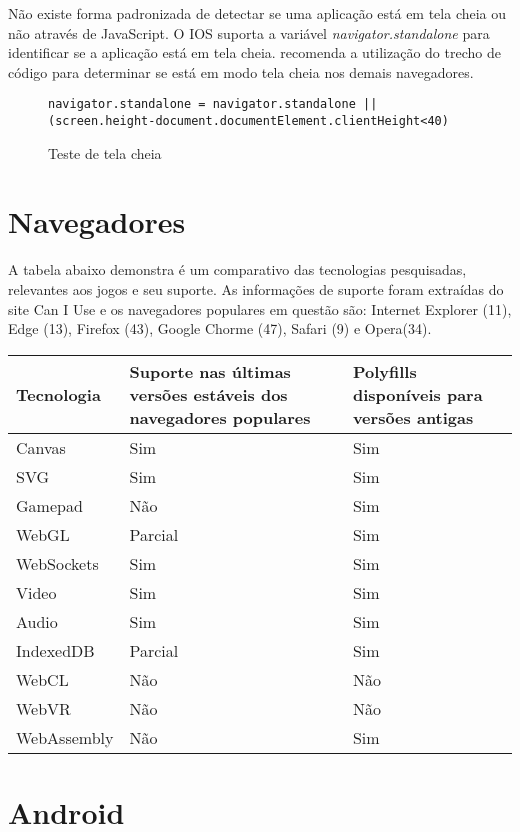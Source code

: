 Não existe forma padronizada de detectar se uma aplicação está em
tela cheia ou não através de JavaScript. O IOS suporta a variável
\textit{navigator.standalone } para identificar se a aplicação está
em tela cheia. \cite{homescreenwebapps} recomenda a utilização do
trecho de código para determinar se está em modo tela cheia
nos demais navegadores.

\begin{figure}[H]
\centering
\begin{verbatim}
navigator.standalone = navigator.standalone || (screen.height-document.documentElement.clientHeight<40)
\end{verbatim}
\caption{Teste de tela cheia}
\label{fig:fixJSTypes}
\end{figure}

\section{Navegadores}

A tabela abaixo demonstra é um comparativo das tecnologias pesquisadas,
relevantes aos jogos e seu suporte. As informações de suporte foram
extraídas do site Can I Use e os navegadores populares em questão
são: Internet Explorer (11), Edge (13), Firefox (43), Google Chorme
(47), Safari (9) e Opera(34).

\begin{tabular}{ |p{3cm}|p{3cm}|p{3cm}|  }
\hline
Tecnologia & Suporte nas últimas versões estáveis dos navegadores populares & Polyfills disponíveis  para versões antigas \\
\hline
Canvas & Sim & Sim \\
SVG & Sim & Sim \\
Gamepad & Não & Sim \\
WebGL & Parcial & Sim \\
WebSockets & Sim & Sim \\
Video & Sim & Sim \\
Audio & Sim & Sim \\
IndexedDB & Parcial & Sim \\
WebCL & Não & Não \\
WebVR & Não & Não \\
WebAssembly & Não & Sim \\
\hline
\end{tabular}

\section{Android}

